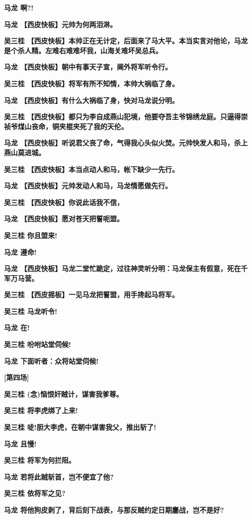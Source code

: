 \textbf{马龙 啊?!}

\textbf{马龙 【西皮快板】元帅为何两泪淋。}

\textbf{吴三桂
【西皮快板】本帅正在无计定，后面来了马大平。本当实言对他论，马龙是个杀人精。左难右难难坏我，山海关难坏吴总兵。}

\textbf{马龙 【西皮快板】朝中有事天子宣，阃外将军听令行。}

\textbf{吴三桂 【西皮快板】将军有所不知情，本帅大祸临了身。}

\textbf{马龙 【西皮快板】有什么大祸临了身，快对马龙说分明。}

\textbf{吴三桂
【西皮快板】都只为李自成燕山犯境，他要夺吾主爷锦绣龙庭。只逼得崇祯爷煤山丧命，铜夹棍夹死了我的天伦。}

\textbf{马龙
【西皮快板】听说君父丧了命，气得我心头似火焚。元帅快发人和马，杀上燕山莫进城。}

\textbf{吴三桂 【西皮快板】本当点动人和马，帐下缺少一先行。}

\textbf{马龙 【西皮快板】元帅发动人和马，马龙情愿做先行。}

\textbf{吴三桂 【西皮快板】你说此话我不信，}

\textbf{马龙 【西皮快板】愿对苍天把誓呃盟。}

\textbf{吴三桂 你且盟来!}

\textbf{马龙 遵命!}

\textbf{马龙
【西皮快板】马龙二堂忙跪定，过往神灵听分明：马龙保主有假意，死在千军万马营。}

\textbf{吴三桂 【西皮摇板】一见马龙把誓盟，用手搀起马将军。}

\textbf{吴三桂 马龙听令!}

\textbf{马龙 在!}

\textbf{吴三桂 吩咐站堂伺候!}

\textbf{马龙 下面听者：众将站堂伺候!}

\textbf{{[}第四场{]}}

\textbf{吴三桂 (念)恼恨奸贼计，谋害我爹尊。}

\textbf{吴三桂 将李虎绑了上来!}

\textbf{吴三桂 唗!胆大李虎，在朝中谋害我父，推出斩了!}

\textbf{马龙 且慢!}

\textbf{吴三桂 将军为何拦阻。}

\textbf{马龙 若将此贼斩首，岂不便宜了他?}

\textbf{吴三桂 依将军之见?}

\textbf{马龙
将他狗皮剥了，背后刻下战表，与那反贼约定日期鏖战，岂不是好?}

